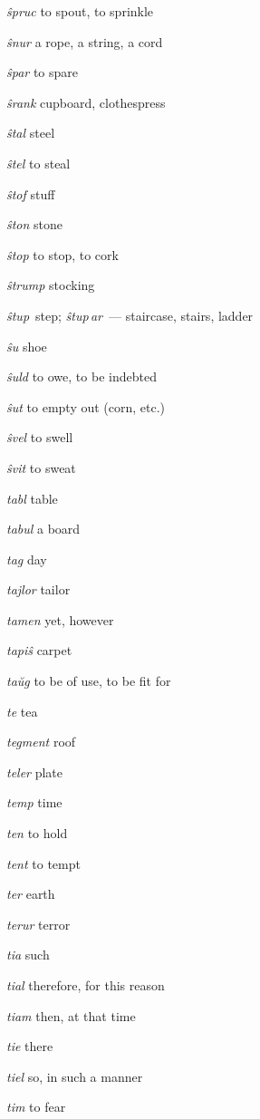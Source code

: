 \begin{landscape}
\begin{multicols}{5}
\begin{outdent}{1em}
\emph{ŝpruc}  to spout, to sprinkle

\emph{ŝnur}  a rope, a string, a cord

\emph{ŝpar}  to spare

\emph{ŝrank}  cupboard,  clothespress

\emph{ŝtal } steel

\emph{ŝtel}  to steal

\emph{ŝtof } stuff

\emph{ŝton}  stone

\emph{ŝtop } to stop, to cork

\emph{ŝtrump } stocking

\emph{ŝtup\, } step; \emph{ŝtup\,ar\,} — staircase, stairs, ladder

\emph{ŝu}  shoe

\emph{ŝuld}  to owe, to be indebted

\emph{ŝut}  to empty out (corn, etc.)

\emph{ŝvel}  to swell

\emph{ŝvit } to sweat
\end{outdent}


\begin{outdent}{1em}
\emph{tabl}  table

\emph{tabul}  a board

\emph{tag}  day

\emph{tajlor}  tailor

\emph{tamen}  yet, however

\emph{tapiŝ}  carpet

\emph{taŭg}  to be of use, to be fit for

\emph{te}  tea

\emph{tegment}  roof

\emph{teler}  plate

\emph{temp}  time

\emph{ten}  to hold

\emph{tent } to tempt

\emph{ter } earth

\emph{terur}  terror

\emph{tia}  such

\emph{tial}  therefore, for this reason

\emph{tiam}  then, at that time

\emph{tie}  there

\emph{tiel}  so, in such a manner

\emph{tim}  to fear


\end{outdent}
\end{multicols}
\end{landscape}
